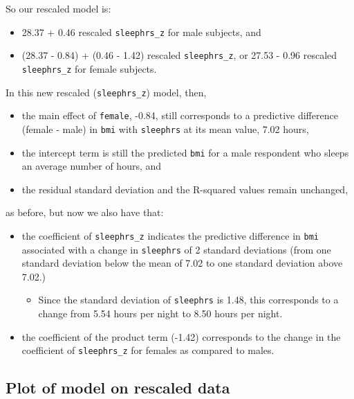 \documentclass[]{book}
\providecommand{\tightlist}{%
  \setlength{\itemsep}{0pt}\setlength{\parskip}{0pt}}
\theoremstyle{definition}
\theoremstyle{definition}
\theoremstyle{definition}
\theoremstyle{remark}
\begin{document}
So our rescaled model is:

\begin{itemize}
\tightlist
\item
  28.37 + 0.46 rescaled \texttt{sleephrs\_z} for male subjects, and
\item
  (28.37 - 0.84) + (0.46 - 1.42) rescaled \texttt{sleephrs\_z}, or 27.53
  - 0.96 rescaled \texttt{sleephrs\_z} for female subjects.
\end{itemize}

In this new rescaled (\texttt{sleephrs\_z}) model, then,

\begin{itemize}
\tightlist
\item
  the main effect of \texttt{female}, -0.84, still corresponds to a
  predictive difference (female - male) in \texttt{bmi} with
  \texttt{sleephrs} at its mean value, 7.02 hours,
\item
  the intercept term is still the predicted \texttt{bmi} for a male
  respondent who sleeps an average number of hours, and
\item
  the residual standard deviation and the R-squared values remain
  unchanged,
\end{itemize}

as before, but now we also have that:

\begin{itemize}
\tightlist
\item
  the coefficient of \texttt{sleephrs\_z} indicates the predictive
  difference in \texttt{bmi} associated with a change in
  \texttt{sleephrs} of 2 standard deviations (from one standard
  deviation below the mean of 7.02 to one standard deviation above
  7.02.)

  \begin{itemize}
  \tightlist
  \item
    Since the standard deviation of \texttt{sleephrs} is 1.48, this
    corresponds to a change from 5.54 hours per night to 8.50 hours per
    night.
  \end{itemize}
\item
  the coefficient of the product term (-1.42) corresponds to the change
  in the coefficient of \texttt{sleephrs\_z} for females as compared to
  males.
\end{itemize}

\subsection{Plot of model on rescaled
data}\label{plot-of-model-on-rescaled-data}
\end{document}
